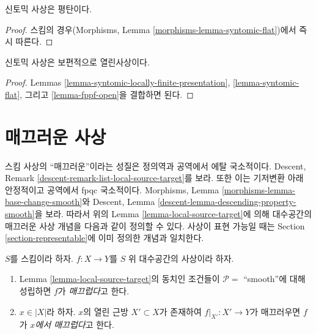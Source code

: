 \begin{lemma}
\label{lemma-syntomic-flat}
신토믹 사상은 평탄이다.
\end{lemma}

\begin{proof}
스킴의 경우(Morphisms, Lemma
\ref{morphisms-lemma-syntomic-flat})에서 즉시 따른다.
\end{proof}

\begin{lemma}
\label{lemma-syntomic-open}
신토믹 사상은 보편적으로 열린사상이다.
\end{lemma}

\begin{proof}
Lemmas \ref{lemma-syntomic-locally-finite-presentation},
\ref{lemma-syntomic-flat}, 그리고
\ref{lemma-fppf-open}을 결합하면 된다.
\end{proof}







\section{매끄러운 사상}
\label{section-smooth}

\noindent
스킴 사상의 “매끄러운”이라는 성질은 정의역과 공역에서 에탈
국소적이다. Descent, Remark
\ref{descent-remark-list-local-source-target}를 보라.
또한 이는 기저변환 아래 안정적이고 공역에서 fpqc 국소적이다.
Morphisms, Lemma \ref{morphisms-lemma-base-change-smooth}와
Descent, Lemma \ref{descent-lemma-descending-property-smooth}을 보라.
따라서 위의 Lemma \ref{lemma-local-source-target}에 의해 대수공간의
매끄러운 사상 개념을 다음과 같이 정의할 수 있다. 사상이 표현 가능일
때는 Section \ref{section-representable}에 이미 정의한 개념과 일치한다.

\begin{definition}
\label{definition-smooth}
$S$를 스킴이라 하자.
$f : X \to Y$를 $S$ 위 대수공간의 사상이라 하자.
\begin{enumerate}
\item Lemma \ref{lemma-local-source-target}의 동치인 조건들이
$\mathcal{P} =$ “smooth”에 대해 성립하면 $f$가 {\it 매끄럽다}고 한다.
\item $x \in |X|$라 하자. $x$의 열린 근방 $X' \subset X$가 존재하여
$f|_{X'} : X' \to Y$가 매끄러우면 $f$가
{\it $x$에서 매끄럽다}고 한다.
\end{enumerate}
\end{definition}

